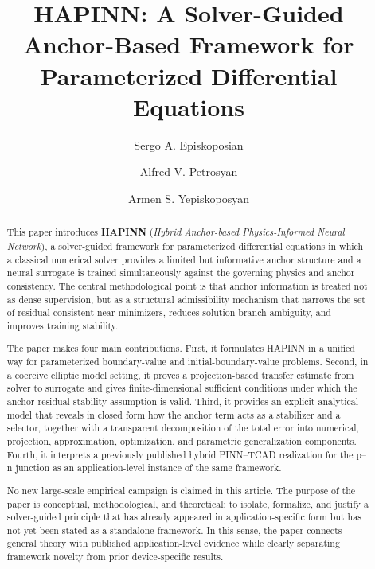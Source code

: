 \documentclass[preprint,12pt]{elsarticle}
\theoremstyle{definition}
\numberwithin{equation}{section}
\begin{document}
\begin{frontmatter}

\title{HAPINN: A Solver-Guided Anchor-Based Framework for Parameterized Differential Equations}

\author[aff1]{Sergo A. Episkoposian}

\author[aff1]{Alfred V. Petrosyan}

\author[aff2]{Armen S. Yepiskoposyan}


\address[aff1]{Department of Applied Mathematics and Physics, National Polytechnic University of Armenia, Teryan 105, Yerevan 0003, Armenia}

\address[aff2]{Institute of Physics, Yerevan State University, Al. Manukyan 1, Yerevan 0003, Armenia}

\begin{abstract}
This paper introduces \textbf{HAPINN} (\emph{Hybrid Anchor-based Physics-Informed Neural Network}), a solver-guided framework for parameterized differential equations in which a classical numerical solver provides a limited but informative anchor structure and a neural surrogate is trained simultaneously against the governing physics and anchor consistency. The central methodological point is that anchor information is treated not as dense supervision, but as a structural admissibility mechanism that narrows the set of residual-consistent near-minimizers, reduces solution-branch ambiguity, and improves training stability.

The paper makes four main contributions. First, it formulates HAPINN in a unified way for parameterized boundary-value and initial-boundary-value problems. Second, in a coercive elliptic model setting, it proves a projection-based transfer estimate from solver to surrogate and gives finite-dimensional sufficient conditions under which the anchor-residual stability assumption is valid. Third, it provides an explicit analytical model that reveals in closed form how the anchor term acts as a stabilizer and a selector, together with a transparent decomposition of the total error into numerical, projection, approximation, optimization, and parametric generalization components. Fourth, it interprets a previously published hybrid PINN--TCAD realization for the p--n junction as an application-level instance of the same framework.

No new large-scale empirical campaign is claimed in this article. The purpose of the paper is conceptual, methodological, and theoretical: to isolate, formalize, and justify a solver-guided principle that has already appeared in application-specific form but has not yet been stated as a standalone framework. In this sense, the paper connects general theory with published application-level evidence while clearly separating framework novelty from prior device-specific results.
\end{abstract}


\end{frontmatter}
\end{document}
